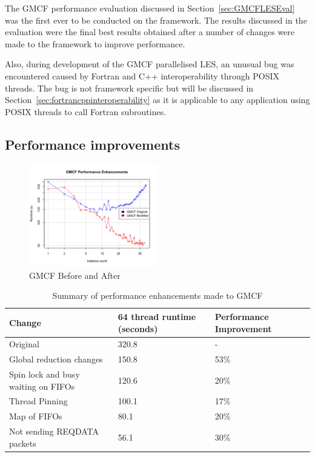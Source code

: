 The GMCF performance evaluation discussed in Section~\ref{sec:GMCFLESEval} was
the first ever to be conducted on the framework. The results discussed in the
evaluation were the final best results obtained after a number of changes were
made to the framework to improve performance.

Also, during development of the GMCF parallelised LES, an unusual bug was
encountered caused by Fortran and C++ interoperability through POSIX threads.
The bug is not framework specific but will be discussed in
Section~\ref{sec:fortrancppinteroperability} as it is applicable to any
application using POSIX threads to call Fortran subroutines.

\subsection{Performance improvements}

\begin{figure}
    \includegraphics[width=0.5\textwidth]
    {graphs/GMCF-before-after-fixed-area.png}
    \caption{GMCF Before and After}
    \label{fig:gmcfbeforeandafter}
\end{figure}

\begin{table}[t]
    \centering
    \begin{tabular}{|l|l|l|}
        \hline
        Change & 64 thread runtime (seconds) & Performance Improvement\\
        \hline
        Original & 320.8 & -\\
        \hline
        Global reduction changes & 150.8 & 53\%\\
        \hline
        Spin lock and busy waiting on FIFOs & 120.6 & 20\%\\
        \hline
        Thread Pinning & 100.1 & 17\%\\
        \hline
        Map of FIFOs & 80.1 & 20\%\\
        \hline
        Not sending REQDATA packets & 56.1 & 30\%\\
        \hline
    \end{tabular}
    \caption{Summary of performance enhancements made to GMCF}
    \label{tab:gmcfperformanceimprovements}
\end{table}

